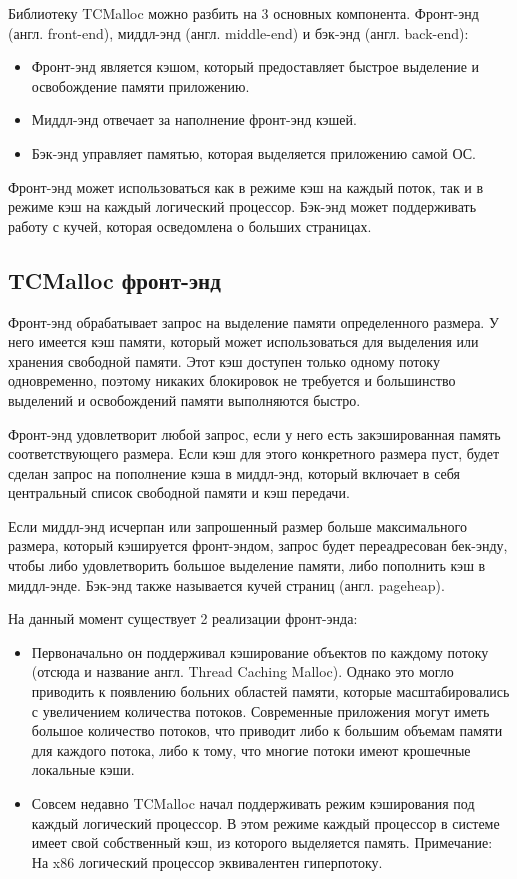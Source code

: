 Библиотеку TCMalloc можно разбить на 3 основных компонента. Фронт-энд (англ. front-end), миддл-энд (англ. middle-end) и бэк-энд (англ. back-end):
\begin{itemize}
	\item Фронт-энд является кэшом, который предоставляет быстрое выделение и освобождение памяти приложению.
	\item Миддл-энд отвечает за наполнение фронт-энд кэшей.
	\item Бэк-энд управляет памятью, которая выделяется приложению самой ОС.
\end{itemize}

Фронт-энд может использоваться как в режиме кэш на каждый поток, так и в режиме кэш на каждый логический процессор. Бэк-энд может поддерживать работу с кучей, которая осведомлена о больших страницах.

\subsection{TCMalloc фронт-энд}

Фронт-энд обрабатывает запрос на выделение памяти определенного размера. У него имеется кэш памяти, который может использоваться для выделения или хранения свободной памяти. Этот кэш доступен только одному потоку одновременно, поэтому никаких блокировок не требуется и большинство выделений и освобождений памяти выполняются быстро.

Фронт-энд удовлетворит любой запрос, если у него есть закэшированная память соответствующего размера. Если кэш для этого конкретного размера пуст, будет сделан запрос на пополнение кэша в миддл-энд, который включает в себя центральный список свободной памяти и кэш передачи.

Если миддл-энд исчерпан или запрошенный размер больше максимального размера, который кэшируется фронт-эндом, запрос будет переадресован бек-энду, чтобы либо удовлетворить большое выделение памяти, либо пополнить кэш в миддл-энде. Бэк-энд также называется кучей страниц (англ. pageheap).

На данный момент существует 2 реализации фронт-энда:
\begin{itemize}
	\item Первоначально он поддерживал кэширование объектов по каждому потоку (отсюда и название англ. Thread Caching Malloc). Однако это могло приводить к появлению больних областей памяти, которые масштабировались с увеличением количества потоков. Современные приложения могут иметь большое количество потоков, что приводит либо к большим объемам памяти для каждого потока, либо к тому, что многие потоки имеют крошечные локальные кэши.
	\item Совсем недавно TCMalloc начал поддерживать режим кэширования под каждый логический процессор. В этом режиме каждый процессор в системе имеет свой собственный кэш, из которого выделяется память. Примечание: На x86 логический процессор эквивалентен гиперпотоку.
\end{itemize}

